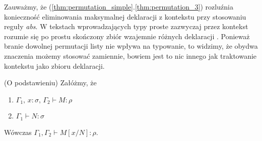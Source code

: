 \begin{uwaga*}
  Zauważmy, że (\ref{thm:permutation_simple}.\ref{thm:permutation_3}) rozluźnia konieczność eliminowania maksymalnej deklaracji z kontekstu przy stosowaniu reguły \emph{abs}. W tekstach wprowadzających typy proste zazwyczaj przez kontekst rozumie się po prostu skończony zbiór wzajemnie różnych deklaracji \cite{Barendregt_1992, Urzyczyn2006, Hindley:2008:LCI:1388400}. Ponieważ branie dowolnej permutacji listy nie wpływa na typowanie, to widzimy, że obydwa znaczenia możemy stosować zamiennie, bowiem jest to nic innego jak traktowanie kontekstu jako zbioru deklaracji. 
\end{uwaga*}

\begin{lemat}(O podstawieniu)\label{thm:substitution}
  Załóżmy, że
  \begin{enumerate}[label=(\alph*)]
    \setlength\itemsep{0em}
    \item \(\Gamma_1,\,x:\sigma,\,\Gamma_2\vdash M:\rho\) 
    \item \(\Gamma_1\vdash N:\sigma\)
  \end{enumerate}
  Wówczas \(\Gamma_1,\Gamma_2 \vdash M[x/N]:\rho\).
\end{lemat}
